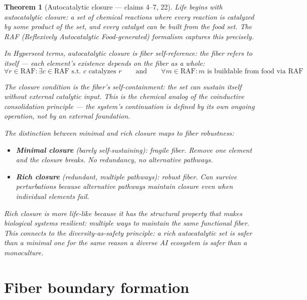 \documentclass[11pt,a4paper]{article}
\newtheorem{theorem}[definition]{Theorem}
\begin{document}
\begin{theorem}[Autocatalytic closure --- claims 4--7, 22]
\label{thm:self-reference}
Life begins with autocatalytic closure: a set of chemical reactions
where every reaction is catalyzed by some product of the set, and
every catalyst can be built from the food set. The RAF (Reflexively
Autocatalytic Food-generated) formalism captures this precisely.

In Hyperseed terms, autocatalytic closure is \emph{fiber self-reference}:
the fiber refers to itself --- each element's existence depends on the
fiber as a whole:
\[
  \forall r \in \text{RAF}: \exists c \in \text{RAF} \text{ s.t. } c
  \text{ catalyzes } r \qquad \text{and} \qquad
  \forall m \in \text{RAF}: m \text{ is buildable from food via RAF}
\]

The closure condition is the fiber's self-containment: the set can
sustain itself without external catalytic input. This is the chemical
analog of the coinductive consolidation principle --- the system's
continuation is defined by its own ongoing operation, not by an
external foundation.

The distinction between minimal and rich closure maps to fiber
robustness:
\begin{itemize}
\item \textbf{Minimal closure} (barely self-sustaining): fragile fiber.
  Remove one element and the closure breaks. No redundancy, no
  alternative pathways.
\item \textbf{Rich closure} (redundant, multiple pathways): robust fiber.
  Can survive perturbations because alternative pathways maintain
  closure even when individual elements fail.
\end{itemize}

Rich closure is more life-like because it has the structural property
that makes biological systems resilient: multiple ways to maintain the
same functional fiber. This connects to the diversity-as-safety
principle: a rich autocatalytic set is safer than a minimal one for
the same reason a diverse AI ecosystem is safer than a monoculture.
\end{theorem}

\section{Fiber boundary formation}
\label{sec:boundary}
\end{document}
